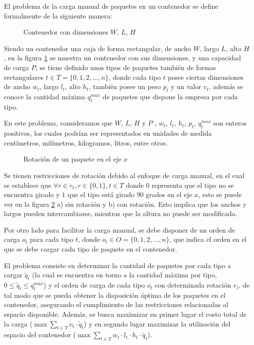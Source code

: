 El problema de la carga manual de paquetes en un contenedor se define formalmente de la siguiente manera:

\begin{figure}[H]
    \centering
    
    \caption{Contenedor con dimensiones $W$, $L$, $H$}
    \label{fig:container}
\end{figure}

Siendo un contenedor una caja de forma rectangular, de ancho $W$, largo $L$, alto $H$, en la figura \ref{fig:container} se muestra un contenedor con sus dimensiones, y una capacidad de carga $P$, se tiene definido unos tipos de paquetes también de formas rectangulares $t \in T = \{0, 1, 2, \ldots, n\}$, donde cada tipo $t$ posee ciertas dimensiones de ancho $w_t$, largo $l_t$, alto $h_t$, también posee un peso $p_t$ y un valor $v_t$, además se conoce la cantidad máxima $q^{max}_t$ de paquetes que dispone la empresa por cada tipo.

En este problema, consideramos que $W$, $L$, $H$ y $P$ , $w_t$, $l_t$, $h_t$, $p_t$, $q^{max}_t$ son enteros positivos, los cuales podrían ser representados en unidades de medida centímetros, milímetros, kilogramos, litros, entre otros.

\begin{figure}[H]
    \centering
    
    \caption{Rotación de un paquete en el eje $x$}
    \label{fig:rotation}
\end{figure}

Se tienen restricciones de rotación debido al enfoque de carga manual, en el cual se establece que $\forall r \in r_t, r \in \{0, 1\}, t \in T$ donde $0$ representa que el tipo no se encuentra girado y $1$ que el tipo está girado 90 grados en el eje $x$, esto se puede ver en la figura \ref{fig:rotation} a) sin rotación y b) con rotación. Esto implica que los anchos y largos pueden intercambiarse, mientras que la altura no puede ser modificada.

Por otro lado para facilitar la carga manual, se debe disponer de un orden de carga $o_t$ para cada tipo $t$, donde $o_t \in O = \{0, 1, 2, \ldots, n\}$, que indica el orden en el que se debe cargar cada tipo de paquete en el contenedor.

El problema consiste en determinar la cantidad de paquetes por cada tipo a cargar $\tilde{q}_t$ (la cual se encuentra en torno a la cantidad máxima por tipo, $0 \leq \tilde{q}_t \leq q^{max}_t$) y el orden de carga de cada tipo $o_t$ con determinada rotación $r_t$, de tal modo que se pueda obtener la disposición óptima de los paquetes en el contenedor, asegurando el cumplimiento de las restricciones relacionadas al espacio disponible. Además, se busca maximizar en primer lugar el costo total de la carga ($\max \sum_{t \in T} v_t \cdot \tilde{q}_t$) y en segundo lugar maximizar la utilización del espacio del contenedor ($\max \sum_{t \in T} w_t \cdot l_t \cdot h_t \cdot \tilde{q}_t$).


